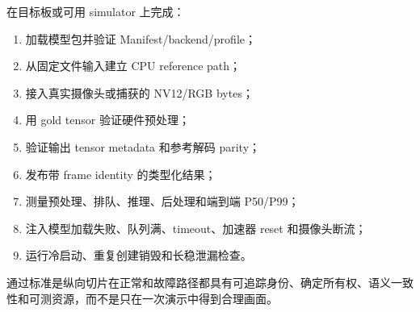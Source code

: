 在目标板或可用 simulator 上完成：

\begin{enumerate}
  \item 加载模型包并验证 Manifest/backend/profile；
  \item 从固定文件输入建立 CPU reference path；
  \item 接入真实摄像头或捕获的 NV12/RGB bytes；
  \item 用 gold tensor 验证硬件预处理；
  \item 验证输出 tensor metadata 和参考解码 parity；
  \item 发布带 frame identity 的类型化结果；
  \item 测量预处理、排队、推理、后处理和端到端 P50/P99；
  \item 注入模型加载失败、队列满、timeout、加速器 reset 和摄像头断流；
  \item 运行冷启动、重复创建销毁和长稳泄漏检查。
\end{enumerate}

通过标准是纵向切片在正常和故障路径都具有可追踪身份、确定所有权、语义一致性和可测资源，而不是只在一次演示中得到合理画面。
